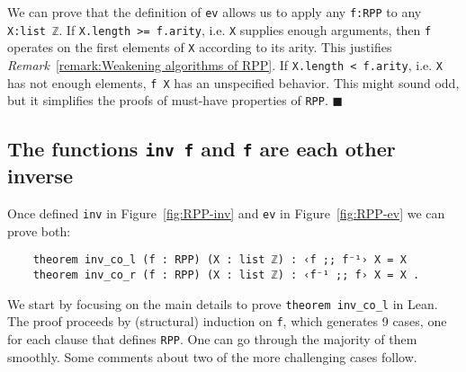 \documentclass[runningheads]{llncs}
\newcommand*{\qeda}{\hfill\ensuremath{\blacksquare}}%
\newcommand{\LEAN}{\textsf{Lean}\xspace}
\begin{document}
\begin{remark}
\label{remark:We keep the definition of ev simple}
We can prove that the definition of \lstinline|ev| allows us to apply any \lstinline|f:RPP| to any \lstinline|X:list ℤ|.
If \lstinline|X.length >= f.arity|, i.e. \lstinline|X| supplies enough arguments, then \lstinline|f| operates on the first elements of \lstinline|X| according to its arity. This justifies \textit{Remark}~\ref{remark:Weakening algorithms of RPP}. If \lstinline|X.length < f.arity|, i.e. \lstinline|X| has not enough elements, \lstinline|f X| has an unspecified behavior. This might sound odd, but it simplifies the proofs of must-have properties of \lstinline|RPP|.
\qeda
\end{remark}

\subsection{The functions {\normalfont \lstinline|inv f|} and {\normalfont \lstinline|f|} are each other inverse}
Once defined \lstinline|inv| in Figure~\ref{fig:RPP-inv} and \lstinline|ev| in Figure~\ref{fig:RPP-ev} we can prove both:
\begin{lstlisting}
    theorem inv_co_l (f : RPP) (X : list ℤ) : ‹f ;; f⁻¹› X = X
    theorem inv_co_r (f : RPP) (X : list ℤ) : ‹f⁻¹ ;; f› X = X .
\end{lstlisting}
We start by focusing on the main details to prove \lstinline|theorem inv_co_l| in \LEAN. The proof proceeds by (structural) induction on \lstinline|f|, which generates 9 cases, one for each clause that defines \lstinline|RPP|. One can go through the majority of them smoothly.
Some comments about two of the more challenging cases follow.
\end{document}
